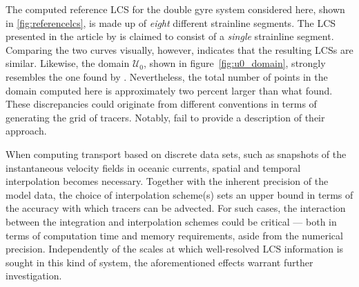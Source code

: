 The computed reference LCS for the double gyre system considered here, shown in
\cref{fig:referencelcs}, is made up of \emph{eight} different strainline
segments. The LCS presented in the article by \textcite{farazmand2012computing}
is claimed to consist of a \emph{single} strainline segment. Comparing the two
curves visually, however, indicates that the resulting LCSs are similar.
Likewise, the domain $\mathcal{U}_{0}$, shown in figure~\ref{fig:u0_domain},
strongly resembles the one found by \citeauthor{farazmand2012computing}.
Nevertheless, the total number of points in the domain computed here is
approximately two percent larger than what \citeauthor{farazmand2012computing}
found. These discrepancies could originate from different conventions in terms
of generating the grid of tracers. Notably, \citeauthor{farazmand2012computing}
fail to provide a description of their approach.

When computing transport based on discrete data sets, such as snapshots of the
instantaneous velocity fields in oceanic currents, spatial and temporal
interpolation becomes necessary. Together with the inherent precision of the
model data, the choice of interpolation scheme(s) sets an upper bound
in terms of the accuracy with which tracers can be advected. For such cases,
the interaction between the integration and interpolation schemes could
be critical --- both in terms of computation time and memory requirements,
aside from the numerical precision. Independently of the scales at which
well-resolved LCS information is sought in this kind of system, the
aforementioned effects warrant further investigation.
